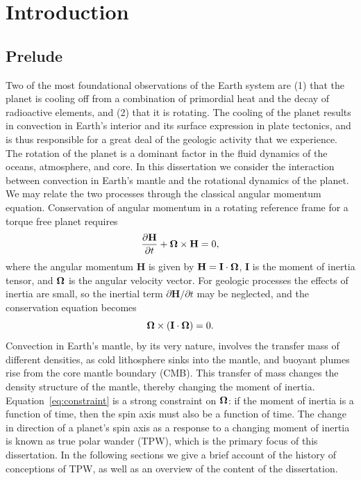 \chapter{Introduction}
\label{chap:intro}

\section{Prelude}

Two of the most foundational observations of the Earth system are 
(1) that the planet is cooling off from a combination of primordial heat and the decay of radioactive elements,
and (2) that it is rotating.
The cooling of the planet results in convection in Earth's interior and its surface expression in plate tectonics,
and is thus responsible for a great deal of the geologic activity that we experience.
The rotation of the planet is a dominant factor in the fluid dynamics of the oceans, atmosphere, and core.
In this dissertation we consider the interaction between convection in Earth's mantle and the rotational dynamics of the planet.
We may relate the two processes through the classical angular momentum equation.
Conservation of angular momentum in a rotating reference frame for a torque free planet requires
\begin{equation}
\frac{\partial \mathbf{H}}{\partial t} + \mitbf{\Omega}\times\mathbf{H} = 0,
\label{eq:conserve_momentum_rotating}
\end{equation}
where the angular momentum $\mathbf{H}$ is given by $\mathbf{H} = \mathbf{I}\cdot\mitbf{\Omega}$,
$\mathbf{I}$ is the moment of inertia tensor, and $\mitbf{\Omega}$ is the angular velocity vector.
For geologic processes the effects of inertia are small, so the inertial
term $\partial \mathbf{H} / \partial t$ may be neglected, and the conservation equation becomes 
\begin{equation}
\mitbf{\Omega}\times \left(\mathbf{I} \cdot \mitbf{\Omega}\right)= 0.
\label{eq:constraint}
\end{equation}
Convection in Earth's mantle, by its very nature, involves the transfer mass of different densities,
as cold lithosphere sinks into the mantle, and buoyant plumes rise from the core mantle boundary (CMB).
This transfer of mass changes the density structure of the mantle, thereby changing the moment of inertia.
Equation~\eqref{eq:constraint} is a strong constraint on $\mitbf{\Omega}$: if the moment of inertia
is a function of time, then the spin axis must also be a function of time.
The change in direction of a planet's spin axis as a response to a changing moment of inertia is known as true polar wander (TPW),
which is the primary focus of this dissertation.
In the following sections we give a brief account of the history of conceptions of TPW,
as well as an overview of the content of the dissertation.

